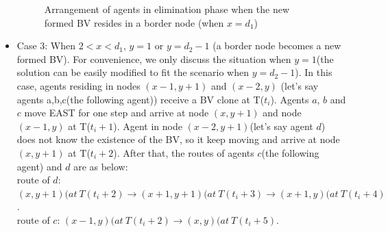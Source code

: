 \begin{itemize}
\begin{figure} [H]
    \caption{Arrangement of agents in elimination phase when the new formed BV resides in a border node (when $x=d_1$)} 
  \label{fig:casetwo} %
\end{figure}

\item Case 3: When $2<x<d_1$, $y=1$ or $y=d_2-1$ (a border node becomes a new formed BV). For convenience, we only discuss the situation when $y=1$(the solution can be easily modified to fit the scenario when $y=d_2-1$). In this case, agents residing in nodes $(x-1, y+1)$ and $(x-2, y)$ (let's say agents a,b,c(the following agent)) receive a BV clone at T($t_i$). Agents $a$, $b$ and $c$ move EAST for one step and arrive at node $(x, y+1)$ and node $(x-1, y)$ at T($t_i+1$). Agent in node $(x-2, y+1)$(let's say agent $d$) does not know the existence of the BV, so it keep moving and arrive at node $(x, y+1)$ at T($t_i+2$). After that, the routes of agents $c$(the following agent) and $d$ are as below:\\
route of $d$: $(x, y+1)(at\ T(t_i+2){\rightarrow}(x+1,y+1)(at\ T(t_i+3){\rightarrow}(x+1,y)(at\ T(t_i+4)$.\\
route of $c$: $(x-1, y)(at\ T(t_i+2){\rightarrow}(x, y)(at\ T(t_i+5)$.



\end{itemize}
